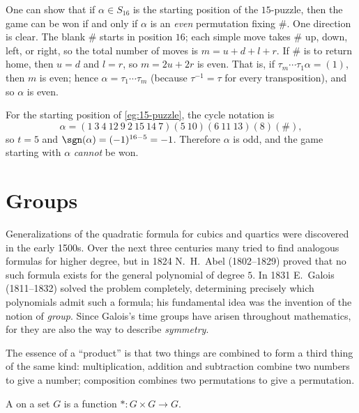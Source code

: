 \begin{eg}\label{eg:15-puzzle-solved}
	One can show that if \(\alpha \in S_{16}\) is the starting position of the \(15\)-puzzle,
	then the game can be won if and only if \(\alpha\) is an \emph{even} permutation fixing
	\(\#\). One direction is clear. The blank \(\#\) starts in position \(16\); each simple
	move takes \(\#\) up, down, left, or right, so the total number of moves is
	\(m = u + d + l + r\). If \(\#\) is to return home, then \(u = d\) and \(l = r\), so
	\(m = 2u + 2r\) is even. That is, if \(\tau_m\cdots\tau_1\alpha = (1)\), then \(m\) is
	even; hence \(\alpha = \tau_1\cdots\tau_m\) (because \(\tau^{-1} = \tau\) for every
	transposition), and so \(\alpha\) is even.

	For the starting position of \autoref{eg:15-puzzle}, the cycle notation is
	\[
		\alpha = (1\ 3\ 4\ 12\ 9\ 2\ 15\ 14\ 7)(5\ 10)(6\ 11\ 13)(8)(\#),
	\]
	so \(t = 5\) and \(\sgn(\alpha) = (-1)^{16-5} = -1\). Therefore \(\alpha\) is odd, and
	the game starting with \(\alpha\) \emph{cannot} be won.
\end{eg}

\section{Groups}

Generalizations of the quadratic formula for cubics and quartics were discovered in the
early 1500s. Over the next three centuries many tried to find analogous formulas for
higher degree, but in 1824 N.~H.~Abel (1802--1829) proved that no such formula exists for
the general polynomial of degree \(5\). In 1831 E.~Galois (1811--1832) solved the problem
completely, determining precisely which polynomials admit such a formula; his fundamental
idea was the invention of the notion of \emph{group}. Since Galois's time groups have
arisen throughout mathematics, for they are also the way to describe \emph{symmetry}.

\begin{intuition}
	The essence of a ``product'' is that two things are combined to form a third thing of
	the same kind: multiplication, addition and subtraction combine two numbers to give a
	number; composition combines two permutations to give a permutation.
\end{intuition}

\begin{definition}
	A  on a set \(G\) is a function
	\(* \colon G \times G \to G\).
\end{definition}

